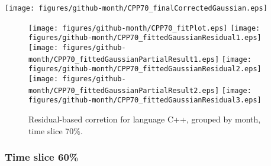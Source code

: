 \begin{center}
{\texttt{[image: figures/github-month/CPP70\_finalCorrectedGaussian.eps]}}
\end{center}

\FloatBarrier

\begin{figure}[t]
\centering
{}
{\texttt{[image: figures/github-month/CPP70\_fitPlot.eps]}}
{\texttt{[image: figures/github-month/CPP70\_fittedGaussianResidual1.eps]}}
{\texttt{[image: figures/github-month/CPP70\_fittedGaussianPartialResult1.eps]}}
{\texttt{[image: figures/github-month/CPP70\_fittedGaussianResidual2.eps]}}
{\texttt{[image: figures/github-month/CPP70\_fittedGaussianPartialResult2.eps]}}
{\texttt{[image: figures/github-month/CPP70\_fittedGaussianResidual3.eps]}}
\caption{Residual-based corretion for language C++, grouped by month, time slice 70\%.}
\end{figure}


\FloatBarrier


\subsubsection{Time slice 60\%}

